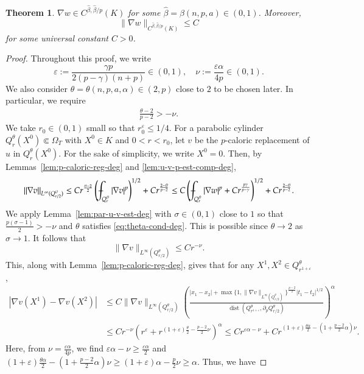 \documentclass[11pt,oneside,english]{amsart}
\newcommand{\e}{\varepsilon}
\newcommand{\al}{\alpha}
\newcommand{\be}{\beta}
\newcommand{\dist}{\operatorname{dist}}
\newcommand{\D}{\nabla}
\numberwithin{equation}{section}
\def\Xint#1{\mathchoice
  {\XXint\displaystyle\textstyle{#1}}%
  {\XXint\textstyle\scriptstyle{#1}}%
  {\XXint\scriptstyle\scriptscriptstyle{#1}}%
  {\XXint\scriptscriptstyle\scriptscriptstyle{#1}}%
  \!\int}
\def\XXint#1#2#3{{\setbox0=\hbox{$#1{#2#3}{\int}$}
    \vcenter{\hbox{$#2#3$}}\kern-.5\wd0}}
\def\dashint{\Xint-}
\newtheorem{theorem}{Theorem}
\theoremstyle{plain}
\numberwithin{equation}{section}
\begin{document}
\begin{theorem}
    \label{thm:par-grad-holder}
   $\D w\in C^{\hat\be,\hat\be/p}(K)$ for some $\hat\be=\hat\be(n,p,a)\in (0,1)$. Moreover, 
    $$
    \|\D w\|_{C^{\hat\be,\hat\be/p }(K)}\le C
    $$
    for some universal constant $C>0$.
\end{theorem}

\begin{proof}
Throughout this proof, we write
$$
\e:=\frac{\gamma p}{2(p-\gamma)(n+p)}\in (0,1),\quad \nu:=\frac{\e\al}{4p}\in(0,1).
$$
We also consider $\theta=\theta(n,p,a,\al)\in(2,p)$ close to $2$ to be chosen later. In particular, we require
\begin{align}
    \label{eq:theta-cond-deg}
    \frac{\theta-2}{p-2}>-\nu.
\end{align}
We take $r_0\in(0,1)$ small so that $r_0^\e\le 1/4$. For a parabolic cylinder $Q_r^\theta(X^0)\Subset \Omega_T$ with  $X^0\in K$ and $0<r<r_0$, let $v$ be the $p$-caloric replacement of $u$ in $Q_r^\theta(X^0)$. For the sake of simplicity, we write $X^0=0$. Then, by Lemmas~\ref{lem:p-caloric-reg-deg} and \ref{lem:u-v-p-est-comp-deg},
\begin{align*}
    \|\D v\|_{L^\infty(Q_{r/2}^\theta)}\le Cr^{\frac{\theta-2}2}\left(\dashint_{Q_r^\theta}|\D v|^p\right)^{1/2}+Cr^{\frac{2-\theta}{p-2}}\le C\left(\dashint_{Q_r^\theta}|\D w|^p+Cr^{\frac{p\gamma}{p-\gamma}}\right)^{1/2}+Cr^{\frac{2-\theta}{p-2}}.
\end{align*}
We apply Lemma~\ref{lem:par-u-v-est-deg} with $\sigma\in(0,1)$ close to $1$ so that $\frac{p(\sigma-1)}2>-\nu$ and $\theta$ satisfies \eqref{eq:theta-cond-deg}. This is possible since $\theta\to2$ as $\sigma\to1$. It follows that
$$
\|\D v\|_{L^\infty(Q^\theta_{r/2})}\le Cr^{-\nu}.
$$
This, along with Lemma~\ref{lem:p-caloric-reg-deg}, gives that for any $X^1,X^2\in Q^\theta_{r^{1+\e}}$,
\begin{align*}
    |\D v(X^1)-\D v(X^2)|&\le C\|\D v\|_{L^\infty(Q_{r/2}^\theta)}\left(\frac{|x_1-x_2|+\max\{1,\|\D v\|_{L^\infty(Q_{r/2}^\theta)}\}^{\frac{p-2}2}|t_1-t_2|^{1/2} }{\dist(Q_{r^{1+\e}}^\theta,\partial_pQ_{r/2}^\theta) } \right)^\al\\
    &\le Cr^{-\nu}\left(r^\e+r^{(1+\e)\frac\theta2-\frac{p-2}2\nu }\right)^\al\le Cr^{\e\al-\nu}+Cr^{(1+\e)\frac{\theta\al}2-\left(1+\frac{p-2}2\al\right)\nu }.
\end{align*}
Here, from $\nu=\frac{\e\al}{4p}$, we find $\e\al-\nu\ge\frac{\e\al}2$ and $(1+\e)\frac{\theta\al}2-\left(1+\frac{p-2}2\al\right)\nu\ge (1+\e)\al-\frac{p}2\nu\ge\al$. Thus, we have

\end{proof}
\end{document}
